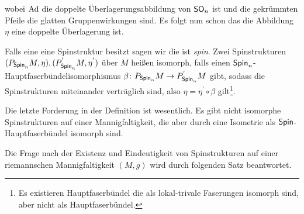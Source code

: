 \begin{Def}[Spinstruktur]
\begin{itemize}
                         wobei $\operatorname{Ad}$ die doppelte
                         Überlagerungsabbildung von $\operatorname{\mathsf{SO}}_n$ ist und
                        die gekrümmten Pfeile die glatten Gruppenwirkungen sind.
                         Es folgt nun schon das die Abbildung $\eta$   eine doppelte Überlagerung ist.
	 \end{itemize}
	 Falls eine \RMF eine Spinstruktur besitzt sagen wir die \mfg
         ist \textit{spin}.
     Zwei Spinstrukturen $ (P_{\operatorname{\mathsf{Spin}}_n}M,\eta),(P_{\operatorname{\mathsf{Spin}}_n}^{'}M,\eta^{'}) $ über $ M $ heißen isomorph, falls einen $ \operatorname{\mathsf{Spin}}_n $-Hauptfaserbündelisomorphismus $ \beta \colon P_{\operatorname{\mathsf{Spin}}_n}M \rightarrow P_{\operatorname{\mathsf{Spin}}_n}^{'}M $ gibt, sodass die
     Spinstrukturen miteinander verträglich sind, also $ \eta=\eta^{'} \circ \beta $ gilt\footnote{Es existieren Hauptfaserbündel die als lokal-trivale Faserungen isomorph sind, aber nicht als Hauptfaserbündel.}.
\end{Def}

Die letzte Forderung in der Definition ist wesentlich. Es gibt nicht isomorphe
Spinstrukturen auf einer Mannigfaltigkeit, die aber durch eine Isometrie
als $ \operatorname{\mathsf{Spin}} $-Hauptfaserbündel isomorph sind.

Die Frage nach der Existenz und Eindeutigkeit von Spinstrukturen 
auf einer riemannschen Mannigfaltigkeit $ (M,g) $ wird durch folgenden
Satz beantwortet.

